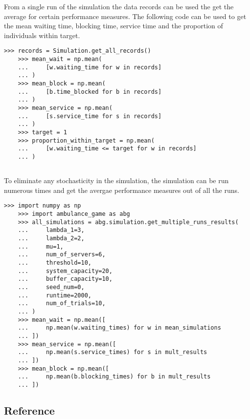 From a single run of the simulation the data records can be used the get the
average for certain performance measures. 
The following code can be used to get the mean waiting time, blocking time, 
service time and the proportion of individuals within target.

\begin{lstlisting}[style=pystyle]
    >>> records = Simulation.get_all_records()
    >>> mean_wait = np.mean(
    ...     [w.waiting_time for w in records]
    ... )
    >>> mean_block = np.mean(
    ...     [b.time_blocked for b in records]
    ... )
    >>> mean_service = np.mean(
    ...     [s.service_time for s in records]
    ... )
    >>> target = 1
    >>> proportion_within_target = np.mean(
    ...     [w.waiting_time <= target for w in records]
    ... )
    
\end{lstlisting}


To eliminate any stochasticity in the simulation, the simulation can be run
numerous times and get the avergae performance measures out of all the runs.


\begin{lstlisting}[style=pystyle]
    >>> import numpy as np
    >>> import ambulance_game as abg
    >>> all_simulations = abg.simulation.get_multiple_runs_results(
    ...     lambda_1=3,
    ...     lambda_2=2,
    ...     mu=1,
    ...     num_of_servers=6,
    ...     threshold=10,
    ...     system_capacity=20,
    ...     buffer_capacity=10,
    ...     seed_num=0,
    ...     runtime=2000,
    ...     num_of_trials=10,
    ... )
    >>> mean_wait = np.mean([
    ...     np.mean(w.waiting_times) for w in mean_simulations
    ... ])
    >>> mean_service = np.mean([
    ...     np.mean(s.service_times) for s in mult_results
    ... ])
    >>> mean_block = np.mean([
    ...     np.mean(b.blocking_times) for b in mult_results
    ... ])
\end{lstlisting}






\subsection{Reference}








